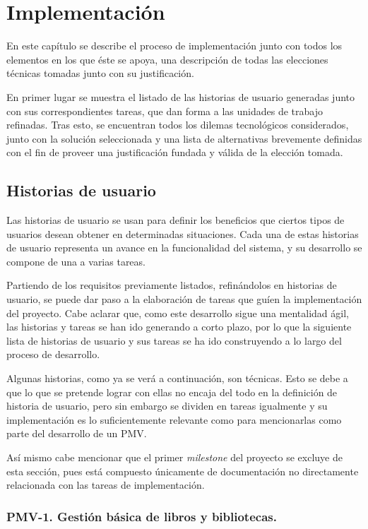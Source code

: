 \chapter{Implementación}

En este capítulo se describe el proceso de implementación junto con todos los elementos en los que éste se apoya, una descripción de todas las elecciones técnicas tomadas junto con su justificación.

En primer lugar se muestra el listado de las historias de usuario generadas junto con sus correspondientes tareas, que dan forma a las unidades de trabajo refinadas. Tras esto, se encuentran todos los dilemas tecnológicos considerados, junto con la solución seleccionada y  una lista de alternativas brevemente definidas con el fin de proveer una justificación fundada y válida de la elección tomada.

\section{Historias de usuario}

Las historias de usuario se usan para definir los beneficios que ciertos tipos de usuarios desean obtener en determinadas situaciones. Cada una de estas historias de usuario representa un avance en la funcionalidad del sistema, y su desarrollo se compone de una a varias tareas.

Partiendo de los requisitos previamente listados, refinándolos en historias de usuario, se puede dar paso a la elaboración de tareas que guíen la implementación del proyecto. Cabe aclarar que, como este desarrollo sigue una mentalidad ágil, las historias y tareas se han ido generando a corto plazo, por lo que la siguiente lista de historias de usuario y sus tareas se ha ido construyendo a lo largo del proceso de desarrollo.

Algunas historias, como ya se verá a continuación, son técnicas. Esto se debe a que lo que se pretende lograr con ellas no encaja del todo en la definición de historia de usuario, pero sin embargo se dividen en tareas igualmente y su implementación es lo suficientemente relevante como para mencionarlas como parte del desarrollo de un PMV.

Así mismo cabe mencionar que el primer \textit{milestone} del proyecto se excluye de esta sección, pues está compuesto únicamente de documentación no directamente relacionada con las tareas de implementación.

\subsection{PMV-1. Gestión básica de libros y bibliotecas.}

